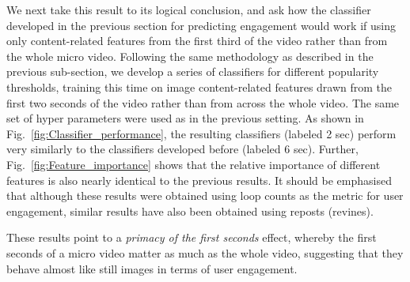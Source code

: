 We next take this result to its logical conclusion, and ask how the classifier developed in the previous section for predicting engagement would work if using only content-related features from the first third of the video rather than from the whole micro video. Following the same methodology as described in the previous sub-section, we develop a series of classifiers for different popularity thresholds, training this time on image content-related features drawn from the first two seconds of the video rather than from across the whole video. The same set of hyper parameters were used as in the previous setting. As shown in Fig.~\ref{fig:Classifier_performance}, the resulting classifiers (labeled 2 sec) perform very similarly to the classifiers developed before (labeled 6 sec). Further, Fig.~\ref{fig:Feature_importance} shows that the relative importance of different features is also nearly identical to the previous results. It should be emphasised that although these results were obtained using loop counts as the metric for user engagement, similar results have also been obtained using reposts (revines). 

These results point to a \emph{primacy of the first seconds} effect, whereby the first seconds of a micro video matter as much as the whole video, suggesting that they behave almost like still images in terms of user engagement.







